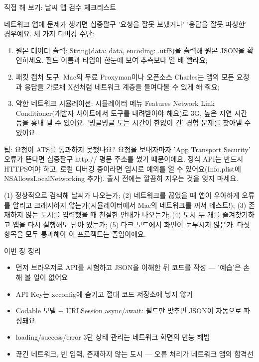\begin{tcbpractice}{직접 해 보기: 날씨 앱 검수 체크리스트}

네트워크 앱에 문제가 생기면 십중팔구 '요청을 잘못 보냈거나' '응답을 잘못 파싱한' 경우예요. 세 가지 디버깅 수단:

\begin{enumerate}
  \item 원본 데이터 출력: String(data: data, encoding: .utf8)을 출력해 원본 JSON을 확인하세요. 필드 이름과 타입이 한눈에 보여 추측보다 열 배 빨라요;
  \item 패킷 캡처 도구: Mac의 무료 Proxyman이나 오픈소스 Charles는 앱의 모든 요청과 응답을 가로채 X선처럼 네트워크 계층을 들여다볼 수 있게 해 줘요;
  \item 약한 네트워크 시뮬레이션: 시뮬레이터 메뉴 Features Network Link Conditioner(개발자 사이트에서 도구를 내려받아야 해요)로 3G, 높은 지연 시간 등을 흉내 낼 수 있어요. '빙글빙글 도는 시간이 한없이 긴' 경험 문제를 찾아낼 수 있어요.
\end{enumerate}

\begin{tcbinfo}{팁: 요청이 ATS를 통과하지 못했나요?}
요청을 보내자마자 'App Transport Security' 오류가 뜬다면 십중팔구 http:// 평문 주소를 썼기 때문이에요. 정식 API는 반드시 HTTPS여야 하고, 로컬 디버깅 중이라면 임시로 예외를 열 수 있어요(Info.plist에 NSAllowsLocalNetworking 추가). 출시 전에는 깔끔히 지우는 것을 잊지 마세요.

\end{tcbinfo}

(1) 정상적으로 검색해 날씨가 나오는가; (2) 네트워크를 끊었을 때 앱이 우아하게 오류를 알리고 크래시하지 않는가(시뮬레이터에서 Mac의 네트워크를 꺼서 테스트!); (3) 존재하지 않는 도시를 입력했을 때 친절한 안내가 나오는가; (4) 도시 두 개를 즐겨찾기하고 앱을 다시 실행해도 남아 있는가; (5) 다크 모드에서 화면이 눈부시지 않은가. 다섯 항목을 모두 통과해야 이 프로젝트는 졸업이에요.

\end{tcbpractice}

\begin{tcbsummary}{이번 장 정리}
\begin{itemize}
  \item 먼저 브라우저로 API를 시험하고 JSON을 이해한 뒤 코드를 작성 — '예습'은 손해 볼 일이 없어요
  \item API Key는 xcconfig에 숨기고 절대 코드 저장소에 넣지 않기
  \item Codable 모델 + URLSession async/await: 필드만 맞추면 JSON이 자동으로 파싱돼요
  \item loading/success/error 3단 상태 관리는 네트워크 화면의 만능 해법
  \item 끊긴 네트워크, 빈 입력, 존재하지 않는 도시 — 오류 처리가 네트워크 앱의 합격선
\end{itemize}

\end{tcbsummary}

